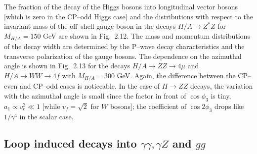 The fraction of the decay of the Higgs bosons into longitudinal vector bosons
[which is zero in the CP--odd Higgs case] and  the distributions with
respect  to the invariant mass of the off--shell gauge boson in the decays $H/A
\to Z^*Z$ for $M_{H/A}=150$ GeV are shown in Fig.~2.12. The mass and momentum 
distributions of the decay width are determined by the P--wave decay 
characteristics and 
the transverse polarization of the gauge bosons. The dependence on the
azimuthal angle is shown in Fig.~2.13 for the decays $H/A \to ZZ \to 4\mu$ and 
$H/A \to WW \to 4f$ with $M_{H/A}=300$ GeV. Again, the difference between the 
CP--even and CP--odd cases is noticeable. In the case of $H \to ZZ$ decays, 
the variation with the azimuthal angle is small since the factor in front 
of $\cos\phi_3$ is tiny, $a_1 \propto v_e^2 \ll 1$ [while $v_f=\sqrt{2}$ for 
$W$ bosons]; the coefficient of  $\cos2\phi_3$ drops like $1/\gamma^4$ in the 
scalar case. 


\begin{figure}[htbp]
\begin{center}
\vspace*{-2.5cm}
\hspace*{-3cm}
\end{center}
\vspace*{-14.6cm}
\vspace*{-.6cm}
\end{figure}

\begin{figure}[htbp]
\begin{center}
\vspace*{-2.9cm}
\hspace*{-3cm}
\end{center}
\vspace*{-14.6cm}
\vspace*{-.6cm}
\end{figure}

\subsection{Loop induced decays into $\gamma \gamma, \gamma Z$ and $gg$}

